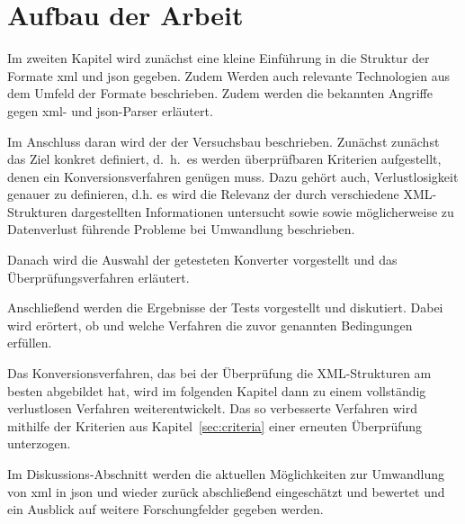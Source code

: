 \section{Aufbau der Arbeit}
\label{sec:structure}

Im zweiten Kapitel wird zunächst eine kleine Einführung in die Struktur der Formate \acrshort{xml} und \acrshort{json} gegeben. Zudem Werden auch relevante Technologien aus dem Umfeld der Formate beschrieben.  Zudem werden die bekannten Angriffe gegen \acrshort{xml}- und \acrshort{json}-Parser erläutert.

Im Anschluss daran wird der der Versuchsbau beschrieben. Zunächst zunächst das Ziel konkret definiert, d.~h.\ es werden
überprüfbaren Kriterien aufgestellt, denen ein Konversionsverfahren genügen
muss. Dazu gehört auch, Verlustlosigkeit genauer zu definieren, d.h.
es wird die Relevanz der durch verschiedene XML-Strukturen dargestellten
Informationen untersucht sowie sowie möglicherweise zu Datenverlust führende
Probleme bei Umwandlung beschrieben.

Danach wird die Auswahl der getesteten Konverter vorgestellt und das Überprüfungsverfahren erläutert.

Anschließend werden die Ergebnisse der Tests vorgestellt und diskutiert.
Dabei wird erörtert, ob und welche Verfahren die zuvor genannten Bedingungen
erfüllen.

Das Konversionsverfahren, das bei der Überprüfung die XML-Strukturen am besten abgebildet hat, wird im folgenden Kapitel dann zu einem vollständig verlustlosen Verfahren weiterentwickelt. Das so verbesserte Verfahren wird mithilfe der Kriterien aus Kapitel~\ref{sec:criteria} einer erneuten Überprüfung unterzogen.

Im Diskussions-Abschnitt werden die aktuellen Möglichkeiten zur Umwandlung
von \acrshort{xml} in \acrshort{json} und wieder zurück abschließend eingeschätzt und bewertet und ein Ausblick auf weitere Forschungfelder gegeben werden.
